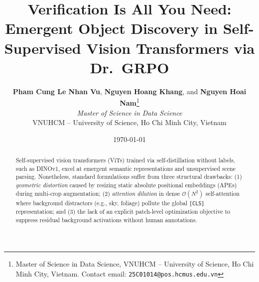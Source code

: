 \documentclass[11pt,a4paper]{article}
\title{\textbf{\LARGE Verification Is All You Need:}\\[0.25em]\textbf{\Large Emergent Object Discovery in Self-Supervised Vision Transformers via Dr.\ GRPO}}
\author{
  \textbf{Pham Cung Le Nhan Vu}, \textbf{Nguyen Hoang Khang}, and \textbf{Nguyen Hoai Nam}\thanks{Master of Science in Data Science, VNUHCM -- University of Science, Ho Chi Minh City, Vietnam. Contact email: \texttt{25C01014@pos.hcmus.edu.vn}} \\[0.35em]
  \textit{Master of Science in Data Science} \\
  VNUHCM -- University of Science, Ho Chi Minh City, Vietnam
}
\date{\today}
\begin{document}
\maketitle

\begin{abstract}
Self-supervised vision transformers (ViTs) trained via self-distillation without labels, such as DINOv1, excel at emergent semantic representations and unsupervised scene parsing. Nonetheless, standard formulations suffer from three structural drawbacks: (1) \textit{geometric distortion} caused by resizing static absolute positional embeddings (APEs) during multi-crop augmentation; (2) \textit{attention dilution} in dense $\mathcal{O}(N^2)$ self-attention where background distractors (e.g., sky, foliage) pollute the global \texttt{[CLS]} representation; and (3) the lack of an explicit patch-level optimization objective to suppress residual background activations without human annotations. 


\end{abstract}
\end{document}
